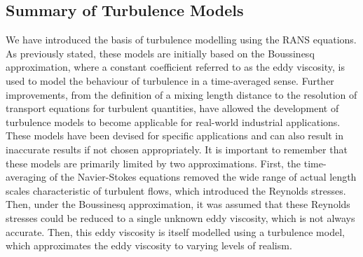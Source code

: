 \subsection{Summary of Turbulence Models}
We have introduced the basis of turbulence modelling using the RANS equations. As previously stated, these models are initially based on the Boussinesq approximation, where a constant coefficient referred to as the eddy viscosity, is used to model the behaviour of turbulence in a time-averaged sense. Further improvements, from the definition of a mixing length distance to the resolution of transport equations for turbulent quantities, have allowed the development of turbulence models to become applicable for real-world industrial applications. These models have been devised for specific applications and can also result in inaccurate results if not chosen appropriately. It is important to remember that these models are primarily limited by two approximations. First, the time-averaging of the Navier-Stokes equations removed the wide range of actual length scales characteristic of turbulent flows, which introduced the Reynolds stresses. Then, under the Boussinesq approximation, it was assumed that these Reynolds stresses could be reduced to a single unknown eddy viscosity, which is not always accurate. Then, this eddy viscosity is itself modelled using a turbulence model, which approximates the eddy viscosity to varying levels of realism.

